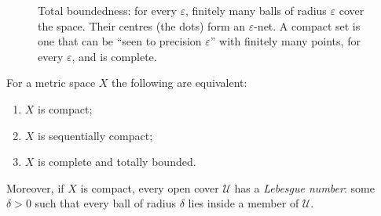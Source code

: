 \begin{figure}[ht]
\centering
{}
\caption{Total boundedness: for every $\varepsilon$, finitely many balls of radius $\varepsilon$ cover the space. Their centres (the dots) form an $\varepsilon$-net. A
compact set is one that can be ``seen to precision $\varepsilon$'' with finitely many points, for every $\varepsilon$, and is complete.}
\label{fig:net}
\end{figure}

\begin{theorem}\label{thm:compactmetric}
For a metric space $X$ the following are equivalent:
\begin{enumerate}[label=(\roman*)]
\item $X$ is compact;
\item $X$ is sequentially compact;
\item $X$ is complete and totally bounded.
\end{enumerate}
Moreover, if $X$ is compact, every open cover $\mathcal U$ has a \emph{Lebesgue number}: some $\delta>0$ such that every ball of radius $\delta$ lies inside a member of $\mathcal U$.
\end{theorem}
